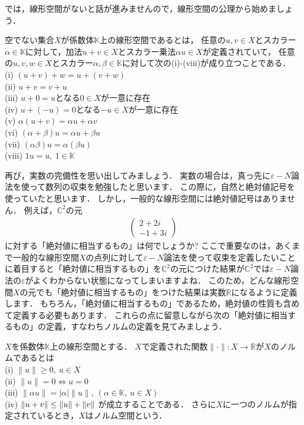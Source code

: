 では，線形空間がないと話が進みませんので，線形空間の公理から始めましょう．

\begin{axiom}[線形空間の公理]\label{axiom:linear_space}
空でない集合$X$が係数体${\mathbb K}$上の線形空間であるとは，
任意の$u, v \in X$とスカラー$\alpha \in {\mathbb K}$に対して，加法$u + v \in X$とスカラー乗法$\alpha u \in X$が定義されていて，
任意の$u,v,w \in X$とスカラー$\alpha, \beta \in {\mathbb K}$に対して次の(i)-(viii)が成り立つことである．\\
(i) $(u + v) + w = u + (v + w)$ \\
(ii) $u + v = v + u$ \\
(iii) $u + 0 = u$となる$0 \in X$が一意に存在 \\
(iv) $u + (-u) = 0$となる$-u \in X$が一意に存在 \\
(v) $\alpha (u + v) = \alpha u + \alpha v$ \\
(vi) $( \alpha + \beta ) u = \alpha u + \beta u$ \\
(vii) $( \alpha \beta ) u = \alpha (\beta u)$ \\
(viii) $1 u = u, ~ 1 \in {\mathbb K}$
\end{axiom}

再び，実数の完備性を思い出してみましょう．
実数の場合は，真っ先に$\varepsilon - N$論法を使って数列の収束を勉強したと思います．
この際に，自然と絶対値記号を使っていたと思います．
しかし，一般的な線形空間には絶対値記号はありません．
例えば，${\mathbb C}^2$の元
\begin{align*}
	\left( \begin{array}{c}
		2 + 2 i \\
		-1 + 3 i
	\end{array} \right)
\end{align*}
に対する「絶対値に相当するもの」は何でしょうか?
ここで重要なのは，あくまで一般的な線形空間$X$の点列に対して$\varepsilon - N$論法を使って収束を定義したいことに着目すると「絶対値に相当するもの」を${\mathbb C}^2$の元につけた結果が${\mathbb C}^2$では$\varepsilon - N$論法の$\varepsilon$がよくわからない状態になってしまいますよね．
このため，どんな線形空間$X$の元でも「絶対値に相当するもの」をつけた結果は実数${\mathbb R}$になるように定義します．
もちろん，「絶対値に相当するもの」であるため，絶対値の性質も含めて定義する必要もあります．
これらの点に留意しながら次の「絶対値に相当するもの」の定義，すなわちノルムの定義を見てみましょう．

\begin{defi}[ノルムとノルム空間の定義]\label{def:App:norm}
$X$を係数体$\mathbb{K}$上の線形空間とする．
$X$で定義された関数$\|\cdot\|: X \rightarrow {\mathbb R} $が$X$のノルムであるとは\\
(i) $\| u \| \ge 0, ~ u\in X$ \\
(ii) $\| u \|=0 \Leftrightarrow u=0$\\
(iii) $\| \alpha u \| = |\alpha| \| u \|, ~ (\alpha \in {\mathbb K},~ u \in X)$\\
(iv) $\| u+v \| \le \|u\| + \|v\|\\$
が成立することである．
さらに$X$に一つのノルムが指定されているとき，$X$はノルム空間という．
\end{defi}

